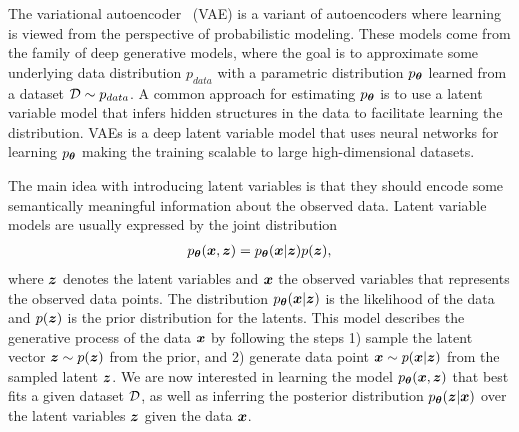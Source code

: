 The variational autoencoder~\cite{kingma2013auto} (VAE) is a variant of autoencoders where learning is viewed from the perspective of probabilistic modeling. These models come from the family of deep generative models, where the goal is to approximate some underlying data distribution $p_{data}$ with a parametric distribution $p_{{\bm{\theta}}}$ learned from a dataset ${\mathcal{D}} \sim p_{data}$. A common approach for estimating $p_{{\bm{\theta}}}$ is to use a latent variable model that infers hidden structures in the data to facilitate learning the distribution. VAEs is a deep latent variable model that uses neural networks for learning $p_{{\bm{\theta}}}$ making the training scalable to large high-dimensional datasets. 

The main idea with introducing latent variables is that they should encode some semantically meaningful information about the observed data. Latent variable models are usually expressed by the joint distribution 
\begin{align}
	p_{{\bm{\theta}}}({\bm{x}}, {\bm{z}}) = p_{{\bm{\theta}}}({\bm{x}} | {\bm{z}}) p({\bm{z}}),
\end{align}
where ${\bm{z}}$ denotes the latent variables and ${\bm{x}}$ the observed variables that represents the observed data points. The distribution $p_{{\bm{\theta}}}({\bm{x}} | {\bm{z}})$ is the likelihood of the data and $p({\bm{z}})$ is the prior distribution for the latents. This model describes the generative process of the data ${\bm{x}}$ by following the steps 1) sample the latent vector ${\bm{z}} \sim p({\bm{z}})$ from the prior, and 2) generate data point ${\bm{x}} \sim p({\bm{x}} | {\bm{z}})$ from the sampled latent ${\bm{z}}$. We are now interested in learning the model $p_{{\bm{\theta}}}({\bm{x}}, {\bm{z}})$ that best fits a given dataset ${\mathcal{D}}$, as well as inferring the posterior distribution $p_{{\bm{\theta}}}({\bm{z}} | {\bm{x}})$ over the latent variables ${\bm{z}}$ given the data ${\bm{x}}$.

